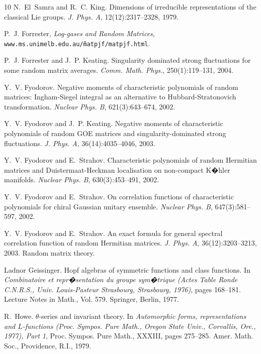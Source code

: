 \documentclass[11pt]{amsart}
\begin{document}
\begin{thebibliography}{10}
N.~El~Samra and R.~C. King. {\newblock}Dimensions of
irreducible representations of the classical Lie groups.
{\newblock} \textit{J. Phys. A}, 12(12):2317--2328, 1979.

 P.~J. Forrester,
\emph{Log-gases and Random Matrices},
\texttt{www.ms.unimelb.edu.au/\~matpjf/matpjf.html}.


P.~J. Forrester and J.~P. Keating. {\newblock}Singularity
dominated strong fluctuations for some random matrix averages.
{\newblock} \textit{Comm. Math. Phys.}, 250(1):119--131, 2004.

Y.~V. Fyodorov. {\newblock}Negative moments of
characteristic polynomials of random matrices: Ingham-Siegel
integral as an alternative to Hubbard-Stratonovich transformation.
{\newblock} \textit{Nuclear Phys. B}, 621(3):643--674, 2002.

Y.~V. Fyodorov and J.~P. Keating. {\newblock}Negative
moments of characteristic polynomials of random GOE matrices and
singularity-dominated strong fluctuations. {\newblock} \textit{J.
Phys. A}, 36(14):4035--4046, 2003.

Y.~V. Fyodorov and E.~Strahov. {\newblock}Characteristic
polynomials of random Hermitian matrices and Duistermaat-Heckman
localisation on non-compact K�hler manifolds. {\newblock}
\textit{Nuclear Phys. B}, 630(3):453--491, 2002.

Y.~V. Fyodorov and E.~Strahov. {\newblock}On correlation
functions of characteristic polynomials for chiral Gaussian
unitary ensemble. {\newblock} \textit{Nuclear Phys. B},
647(3):581--597, 2002.

Y.~V. Fyodorov and E.~Strahov. {\newblock}An exact formula
for general spectral correlation function of random Hermitian
matrices. {\newblock} \textit{J. Phys. A}, 36(12):3203--3213,
2003. {\newblock}Random matrix theory.

Ladnor Geissinger. {\newblock}Hopf algebras of
symmetric functions and class functions. {\newblock}In
\textit{Combinatoire et repr�sentation du groupe sym�trique (Actes
Table Ronde C.N.R.S., Univ. Louis-Pasteur Strasbourg, Strasbourg,
1976)}, pages 168--181. Lecture Notes in Math., Vol. 579.
Springer, Berlin, 1977.

R.~Howe. {\newblock} $\theta$-series and invariant
theory. {\newblock}In \textit{Automorphic forms, representations
and $L$-functions (Proc. Sympos. Pure Math., Oregon State Univ.,
Corvallis, Ore., 1977), Part 1}, Proc. Sympos. Pure Math., XXXIII,
pages 275--285. Amer. Math. Soc., Providence, R.I., 1979.


\end{thebibliography}
\end{document}
